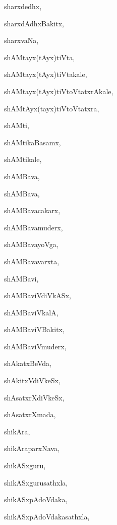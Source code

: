 \begin{multicols}{2}
{sharxdedhx}, \pageref{sharxdedhx}

{sharxdAdhxBakitx}, \pageref{sharxdAdhxBakitx}

{sharxvaNa}, \pageref{sharxvaNa}

{shAMtayx(tAyx)tiVta}, \pageref{shAMtayxtAyxtiVta}

{shAMtayx(tAyx)tiVtakale}, \pageref{shAMtayxtAyxtiVtakale}

{shAMtayx(tAyx)tiVtoVtatxrAkale}, \pageref{shAMtayxtAyxtiVtoVtatxrAkale}

{shAMtAyx(tayx)tiVtoVtatxra}, \pageref{shAMtAyxtayxtiVtoVtatxra}

{shAMti}, \pageref{shAMti}

{shAMtikaBasamx}, \pageref{shAMtikaBasamx}

{shAMtikale}, \pageref{shAMtikale}

{shAMBava}, \pageref{shAMBava1}

{shAMBava}, \pageref{shAMBava2}

{shAMBavacakarx}, \pageref{shAMBavacakarx}

{shAMBavamuderx}, \pageref{shAMBavamuderx}

{shAMBavayoVga}, \pageref{shAMBavayoVga}

{shAMBavavarxta}, \pageref{shAMBavavarxta}

{shAMBavi}, \pageref{shAMBavi}

{shAMBaviVdiVkASx}, \pageref{shAMBaviVdiVkASx}

{shAMBaviVkalA}, \pageref{shAMBaviVkalA}

{shAMBaviVBakitx}, \pageref{shAMBaviVBakitx}

{shAMBaviVmuderx}, \pageref{shAMBaviVmuderx}

{shAkatxBeVda}, \pageref{shAkatxBeVda}

{shAkitxVdiVkeSx}, \pageref{shAkitxVdiVkeSx}

{shAsatxrXdiVkeSx}, \pageref{shAsatxrXdiVkeSx}

{shAsatxrXmada}, \pageref{shAsatxrXmada}

{shikAra}, \pageref{shikAra}

{shikAraparxNava}, \pageref{shikAraparxNava}

{shikASxguru}, \pageref{shikASxguru}

{shikASxgurusathxla}, \pageref{shikASxgurusathxla}

{shikASxpAdoVdaka}, \pageref{shikASxpAdoVdaka}

{shikASxpAdoVdakasathxla}, \pageref{shikASxpAdoVdakasathxla}


\end{multicols}
